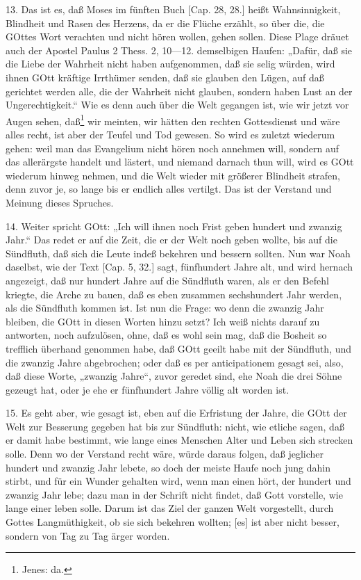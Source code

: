 13. Das ist es, daß Moses im fünften Buch [Cap. 28, 28.] heißt Wahnsinnigkeit, Blindheit und Rasen des Herzens, da er die Flüche erzählt, so über die, die GOttes Wort verachten und nicht hören wollen, gehen sollen. Diese Plage dräuet auch der Apostel Paulus 2 Thess. 2, 10—12. demselbigen Haufen: „Dafür, daß sie die Liebe der Wahrheit nicht haben aufgenommen, daß sie selig würden, wird ihnen GOtt kräftige Irrthümer senden, daß sie glauben den Lügen, auf daß gerichtet werden alle, die der Wahrheit nicht glauben, sondern haben Lust an der Ungerechtigkeit.“ Wie es denn auch über die Welt gegangen ist, wie wir jetzt vor Augen sehen, daß\footnote{Jenes: da.} wir meinten, wir hätten den rechten Gottesdienst und wäre alles recht, ist aber der Teufel und Tod gewesen. So wird es zuletzt wiederum gehen: weil man das Evangelium nicht hören noch annehmen will, sondern auf das allerärgste handelt und lästert, und niemand darnach thun will, wird es GOtt wiederum hinweg nehmen, und die Welt wieder mit größerer Blindheit strafen, denn zuvor je, so lange bis er endlich alles vertilgt. Das ist der Verstand und Meinung dieses Spruches.

14. Weiter spricht GOtt: „Ich will ihnen noch Frist geben hundert und zwanzig Jahr.“ Das redet er auf die Zeit, die er der Welt noch geben wollte, bis auf die Sündfluth, daß sich die Leute indeß bekehren und bessern sollten. Nun war Noah daselbst, wie der Text [Cap. 5, 32.] sagt, fünfhundert Jahre alt, und wird hernach angezeigt, daß nur hundert Jahre auf die Sündfluth waren, als er den Befehl kriegte, die Arche zu bauen, daß es eben zusammen sechshundert Jahr werden, als die Sündfluth kommen ist. Ist nun die Frage: wo denn die zwanzig Jahr bleiben, die GOtt in diesen Worten hinzu setzt? Ich weiß nichts darauf zu antworten, noch aufzulösen, ohne, daß es wohl sein mag, daß die Bosheit so trefflich überhand genommen habe, daß GOtt geeilt habe mit der Sündfluth, und die zwanzig Jahre abgebrochen; oder daß es per anticipationem gesagt sei, also, daß diese Worte, „zwanzig Jahre“, zuvor geredet sind, ehe Noah die drei Söhne gezeugt hat, oder je ehe er fünfhundert Jahre völlig alt worden ist.

15. Es geht aber, wie gesagt ist, eben auf die Erfristung der Jahre, die GOtt der Welt zur Besserung gegeben hat bis zur Sündfluth: nicht, wie etliche sagen, daß er damit habe bestimmt, wie lange eines Menschen Alter und Leben sich strecken solle. Denn wo der Verstand recht wäre, würde daraus folgen, daß jeglicher hundert und
zwanzig Jahr lebete, so doch der meiste Haufe noch jung dahin stirbt, und für ein Wunder gehalten wird, wenn man einen hört, der hundert und zwanzig Jahr lebe; dazu man in der Schrift nicht findet, daß Gott vorstelle, wie lange einer leben solle. Darum ist das Ziel der ganzen Welt vorgestellt, durch Gottes Langmüthigkeit, ob sie sich bekehren wollten; [es] ist aber nicht besser, sondern von Tag zu Tag ärger worden.

